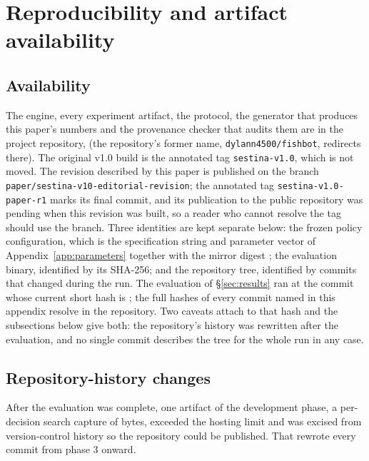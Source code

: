 \section{Reproducibility and artifact availability}
\label{app:repro}

\subsection*{Availability}

The engine, every experiment artifact, the protocol, the generator that produces this paper's
numbers and the provenance checker that audits them are in the project repository,
 (the repository's former name,
\texttt{dylann4500/fishbot}, redirects there). The original v1.0 build is the annotated tag
\texttt{sestina-v1.0}, which is not moved. The revision described by this paper is published on
the branch \texttt{paper/sestina-v10-editorial-revision}; the annotated tag
\texttt{sestina-v1.0-paper-r1} marks its final commit, and its publication to the public
repository was pending when this revision was built, so a reader who cannot resolve the tag should
use the branch. Three identities are kept separate below: the frozen
policy configuration, which is the specification string and parameter vector of
Appendix~\ref{app:parameters} together with the mirror digest \texttt{\vsevenMirrorDigest{}}; the
evaluation binary, identified by its SHA-256; and the repository tree, identified by commits that
changed during the run. The evaluation of \S\ref{sec:results} ran at the commit whose current
short hash is \texttt{\vsevenBzeroCommit{}}; the full hashes of every commit named in this appendix
resolve in the repository. Two caveats attach to that hash and the subsections below give both:
the repository's history was rewritten after the evaluation, and no single commit describes the
tree for the whole run in any case.

\subsection*{Repository-history changes}

After the evaluation was complete, one artifact of the development phase, a per-decision search
capture of \vsevenKfiveBytes{} bytes, exceeded the hosting limit and was excised from version-control
history so the repository could be published. That rewrote every commit from phase 3 onward.

